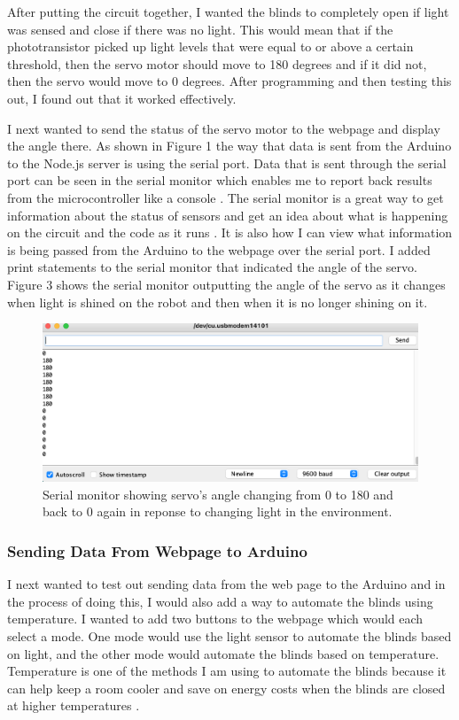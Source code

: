 \documentclass[10pt,twocolumn]{article}
\begin{document}
After putting the circuit together, I wanted the blinds to completely open if light was sensed and close if there was no light. This would mean that if the phototransistor picked up light levels that were equal to or above a certain threshold, then the servo motor should move to 180 degrees and if it did not, then the servo would move to 0 degrees. After programming and then testing this out, I found out that it worked effectively. 

I next wanted to send the status of the servo motor to the webpage and display the angle there. As shown in Figure 1 the way that data is sent from the Arduino to the Node.js server is using the serial port. Data that is sent through the serial port can be seen in the serial monitor which enables me to report back results from the microcontroller like a console \cite{Fitzgerald2015Arduino}. The serial monitor is a great way to get information about the status of sensors and get an idea about what is happening on the circuit and the code as it runs \cite{Fitzgerald2015Arduino}. It is also how I can view what information is being passed from the Arduino to the webpage over the serial port. I added print statements to the serial monitor that indicated the angle of the servo. Figure 3 shows the serial monitor outputting the angle of the servo as it changes when light is shined on the robot and then when it is no longer shining on it. 

\begin{figure}
    \centering
    \includegraphics[width=.95\linewidth]{Figure 3.png}
    \caption{
        Serial monitor showing servo's angle changing from 0 to 180 and back to 0 again in reponse to changing light in the environment.
    }
    \label{fig:fig3}
\end{figure}

\subsubsection*{Sending Data From Webpage to Arduino}
I next wanted to test out sending data from the web page to the Arduino and in the process of doing this, I would also add a way to automate the blinds using temperature. I wanted to add two buttons to the webpage which would each select a mode. One mode would use the light sensor to automate the blinds based on light, and the other mode would automate the blinds based on temperature. Temperature is one of the methods I am using to automate the blinds because it can help keep a room cooler and save on energy costs when the blinds are closed at higher temperatures \cite{Jang2014ToStayCool}.
\end{document}
